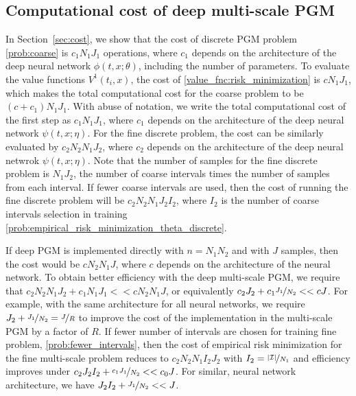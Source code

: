 \documentclass{article}
\numberwithin{equation}{section}
\begin{document}
\subsection{Computational cost of deep multi-scale PGM}
In Section~\ref{sec:cost}, we show that the cost of discrete PGM problem \eqref{prob:coarse} is $c_1N_1J_1$ operations, where $c_1$ depends on the architecture of the deep neural network $\phi(t,x;\theta)$, including the number of parameters. 
To evaluate the value functions $V^1(t_i,x)$, the cost of \eqref{value_fnc:risk_minimization} is $cN_1J_1$, which makes the total computational cost for the coarse problem to be $(c+c_1)N_1J_1$.  With abuse of notation, we write the total computational cost of the first step as $c_1N_1J_1$, where $c_1$ depends on the architecture of the deep neural network $\psi(t,x;\eta)$.
For the fine discrete problem, the cost can be similarly evaluated by  $c_2N_2N_1J_2$, where $c_2$ depends on the architecture of the deep neural netwrok $\psi(t,x;\eta)$. Note that the number of samples for the fine discrete problem is $N_1J_2$, the number of coarse intervals times the number of samples from each interval. If fewer coarse intervals are used, then the cost of running the fine discrete problem will be $c_2N_2N_1J_2I_2$, where $I_2$ is the number of coarse intervals selection in training \eqref{prob:empirical_risk_minimization_theta_discrete}.

If  deep PGM is implemented directly with $n=N_1N_2$ and with $J$ samples, then the cost would be $cN_2N_1J$, where $c$ depends on the architecture of the neural network.
To obtain better efficiency with the deep multi-scale PGM, we require that $c_2N_2N_1J_2+c_1N_1J_1<<cN_2N_1J$, or equivalently $c_2J_2+c_1\nicefrac{J_1}{N_2}<<cJ$. For example, with  the  same  architecture for all neural networks, we require $J_2+\nicefrac{J_1}{N_2}=\nicefrac{J}{R}$ to improve the cost of the implementation in the multi-scale PGM by a factor of $R$. 
If fewer number of intervals are chosen for training fine problem, \eqref{prob:fewer_intervals}, then the cost of empirical risk minimization for the fine multi-scale problem reduces to $c_2N_2N_1I_2J_2$ with $I_2=\nicefrac{|\mathcal{I}|}{N_1}$ and efficiency improves under $c_2J_2I_2+\nicefrac{c_1J_1}{N_2}<<c_0J$. For similar, neural network architecture, we have $J_2I_2+\nicefrac{J_1}{N_2}<<J$. 
\end{document}
